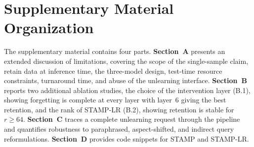 \section{Supplementary Material Organization}
The supplementary material contains four parts. \textbf{Section~A} presents an extended discussion of limitations, covering the scope of the single-sample claim, retain data at inference time, the three-model design, test-time resource constraints, turnaround time, and abuse of the unlearning interface. \textbf{Section~B} reports two additional ablation studies, the choice of the intervention layer (B.1), showing forgetting is complete at every layer with layer~6 giving the best retention, and the rank of STAMP-LR (B.2), showing retention is stable for $r \geq 64$. \textbf{Section~C} traces a complete unlearning request through the pipeline and quantifies robustness to paraphrased, aspect-shifted, and indirect query reformulations. \textbf{Section~D} provides code snippets for STAMP and STAMP-LR.

